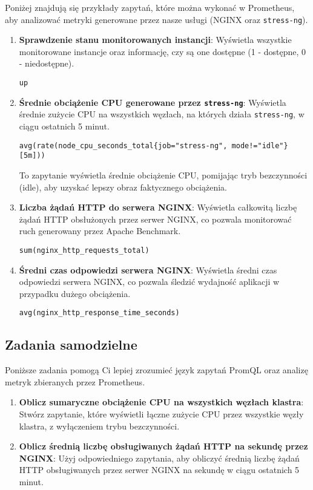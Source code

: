 \documentclass{article}
\begin{document}
Poniżej znajdują się przykłady zapytań, które można wykonać w Prometheus, aby analizować metryki generowane przez nasze usługi (NGINX oraz \texttt{stress-ng}).
\begin{enumerate}
  \item \textbf{Sprawdzenie stanu monitorowanych instancji}: Wyświetla wszystkie monitorowane instancje oraz informację, czy są one dostępne (1 - dostępne, 0 - niedostępne).
\begin{lstlisting}
up
\end{lstlisting}

\item \textbf{Średnie obciążenie CPU generowane przez \texttt{stress-ng}}: Wyświetla średnie zużycie CPU na wszystkich węzłach, na których działa \texttt{stress-ng}, w ciągu ostatnich 5 minut.
\begin{lstlisting}
avg(rate(node_cpu_seconds_total{job="stress-ng", mode!="idle"}[5m]))
\end{lstlisting}
To zapytanie wyświetla średnie obciążenie CPU, pomijając tryb bezczynności (idle), aby uzyskać lepszy obraz faktycznego obciążenia.

\item \textbf{Liczba żądań HTTP do serwera NGINX}: Wyświetla całkowitą liczbę żądań HTTP obsłużonych przez serwer NGINX, co pozwala monitorować ruch generowany przez Apache Benchmark.
\begin{lstlisting}
sum(nginx_http_requests_total)
\end{lstlisting}

\item \textbf{Średni czas odpowiedzi serwera NGINX}: Wyświetla średni czas odpowiedzi serwera NGINX, co pozwala śledzić wydajność aplikacji w przypadku dużego obciążenia.
\begin{lstlisting}
avg(nginx_http_response_time_seconds)
\end{lstlisting}
\end{enumerate}

\subsection{Zadania samodzielne}

Poniższe zadania pomogą Ci lepiej zrozumieć język zapytań PromQL oraz analizę metryk zbieranych przez Prometheus.

\begin{enumerate}
    \item \textbf{Oblicz sumaryczne obciążenie CPU na wszystkich węzłach klastra}: Stwórz zapytanie, które wyświetli łączne zużycie CPU przez wszystkie węzły klastra, z wyłączeniem trybu bezczynności.

    \item \textbf{Oblicz średnią liczbę obsługiwanych żądań HTTP na sekundę przez NGINX}: Użyj odpowiedniego zapytania, aby obliczyć średnią liczbę żądań HTTP obsługiwanych przez serwer NGINX na sekundę w ciągu ostatnich 5 minut.

\end{enumerate}
\end{document}
